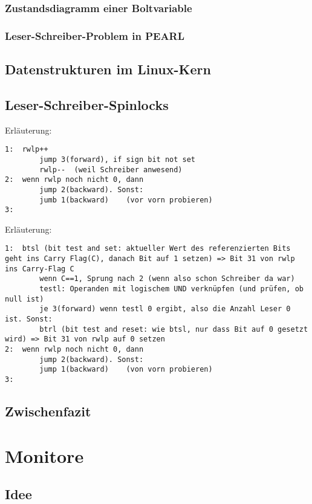 \subsubsection{Zustandsdiagramm einer Boltvariable}
\subsubsection{Leser-Schreiber-Problem in PEARL}

\subsection{Datenstrukturen im Linux-Kern}

\subsection{Leser-Schreiber-Spinlocks}
Erläuterung:
\begin{lstlisting}
1:	rwlp++
		jump 3(forward), if sign bit not set
		rwlp--	(weil Schreiber anwesend)
2:	wenn rwlp noch nicht 0, dann
		jump 2(backward). Sonst:
		jumb 1(backward)	(vor vorn probieren)
3:
\end{lstlisting}
Erläuterung:
\begin{lstlisting}
1:	btsl (bit test and set: aktueller Wert des referenzierten Bits geht ins Carry Flag(C), danach Bit auf 1 setzen) => Bit 31 von rwlp ins Carry-Flag C
		wenn C==1, Sprung nach 2 (wenn also schon Schreiber da war)
		testl: Operanden mit logischem UND verknüpfen (und prüfen, ob null ist)
		je 3(forward) wenn testl 0 ergibt, also die Anzahl Leser 0 ist. Sonst:
		btrl (bit test and reset: wie btsl, nur dass Bit auf 0 gesetzt wird) => Bit 31 von rwlp auf 0 setzen
2:	wenn rwlp noch nicht 0, dann
		jump 2(backward). Sonst:
		jump 1(backward)	(von vorn probieren)
3:
\end{lstlisting}

\subsection{Zwischenfazit}

\section{Monitore}
\subsection{Idee}
